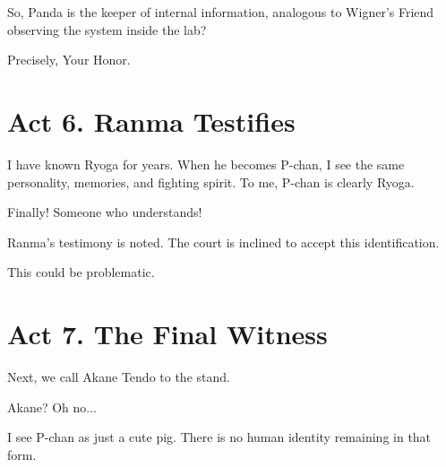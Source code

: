 \documentclass[12pt]{article}
\begin{document}
\begin{tcolorbox}[title=Judge:]
So, Panda is the keeper of internal information, analogous to Wigner’s Friend observing the system inside the lab?
\end{tcolorbox}

\begin{tcolorbox}[title=Professor Wigner:]
Precisely, Your Honor.
\end{tcolorbox}

\section*{Act 6. Ranma Testifies}

\begin{tcolorbox}[title=Ranma:]
I have known Ryoga for years. When he becomes P-chan, I see the same personality, memories, and fighting spirit. To me, P-chan is clearly Ryoga.
\end{tcolorbox}

\begin{tcolorbox}[title={Ryoga (beaming):}]
Finally! Someone who understands!
\end{tcolorbox}

\begin{tcolorbox}[title=Judge:]
Ranma’s testimony is noted. The court is inclined to accept this identification.
\end{tcolorbox}

\begin{tcolorbox}[title={Defense Counsel (whispering):}]
This could be problematic.
\end{tcolorbox}

\section*{Act 7. The Final Witness}

\begin{tcolorbox}[title=Judge:]
Next, we call Akane Tendo to the stand.
\end{tcolorbox}

\begin{tcolorbox}[title={Ryoga (nervous):}]
Akane? Oh no...
\end{tcolorbox}

\begin{tcolorbox}[title=Akane:]
I see P-chan as just a cute pig. There is no human identity remaining in that form.
\end{tcolorbox}
\end{document}
